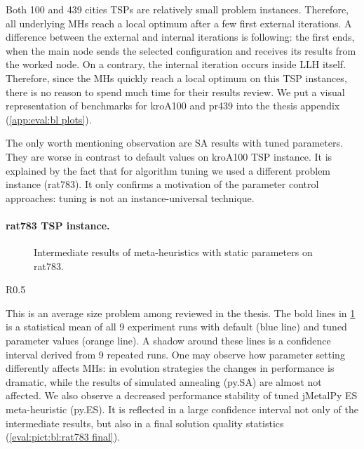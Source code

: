 Both 100 and 439 cities TSPs are relatively small problem instances. Therefore, all underlying MHs reach a local optimum after a few first external iterations. A difference between the external and internal iterations is following: the first ends, when the main node sends the selected configuration and receives its results from the worked node. On a contrary, the internal iteration occurs inside LLH itself. Therefore, since the MHs quickly reach a local optimum on this TSP instances, there is no reason to spend much time for their results review. We put a visual representation of benchmarks for kroA100 and pr439 into the thesis appendix (\cref{app:eval:bl plots}).

The only worth mentioning observation are SA results with tuned parameters. They are worse in contrast to default values on kroA100 TSP instance. It is explained by the fact that for algorithm tuning we used a different problem instance (rat783). It only confirms a motivation of the parameter control approaches: tuning is not an instance-universal technique.

\paragraph{rat783 TSP instance.}
\begin{figure}[b]
	\centering
	\vspace{-20pt}
	
	\caption{Intermediate results of meta-heuristics with static parameters on rat783.}
	\vspace{-5pt}
	\label{eval:pict:bl:rat783 intermediate}
\end{figure}

\setlength{\columnsep}{5pt}%
\setlength{\intextsep}{5pt}%
\begin{wrapfigure}{R}{0.5\textwidth}%
	\centering
	
	\label{eval:pict:bl:rat783 final}
	\caption{Final results of meta-heuristics with static parameters on rat783.}
	\vspace{-10pt}
\end{wrapfigure}
This is an average size problem among reviewed in the thesis. The bold lines in \cref{eval:pict:bl:rat783 intermediate} is a statistical mean of all 9 experiment runs with default (blue line) and tuned parameter values (orange line). A shadow around these lines is a confidence interval derived from 9 repeated runs. One may observe how parameter setting differently affects MHs: in evolution strategies the changes in performance is dramatic, while the results of simulated annealing (py.SA) are almost not affected. We also observe a decreased performance stability of tuned jMetalPy ES meta-heuristic (py.ES). It is reflected in a large confidence interval not only of the intermediate results, but also in a final solution quality statistics (\cref{eval:pict:bl:rat783 final}).

